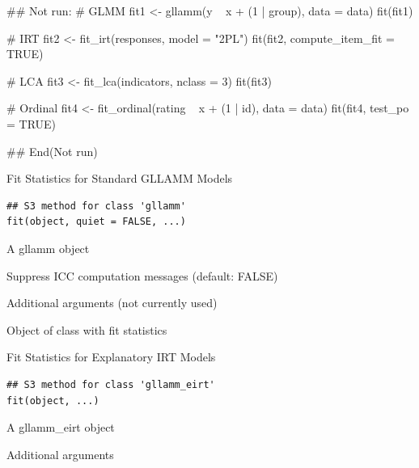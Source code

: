 \documentclass[a4paper]{book}
\begin{document}
%
\begin{Examples}
\begin{ExampleCode}
## Not run: 
# GLMM
fit1 <- gllamm(y ~ x + (1 | group), data = data)
fit(fit1)

# IRT
fit2 <- fit_irt(responses, model = "2PL")
fit(fit2, compute_item_fit = TRUE)

# LCA
fit3 <- fit_lca(indicators, nclass = 3)
fit(fit3)

# Ordinal
fit4 <- fit_ordinal(rating ~ x + (1 | id), data = data)
fit(fit4, test_po = TRUE)

## End(Not run)

\end{ExampleCode}
\end{Examples}
%
\begin{Description}
Fit Statistics for Standard GLLAMM Models
\end{Description}
%
\begin{Usage}
\begin{verbatim}
## S3 method for class 'gllamm'
fit(object, quiet = FALSE, ...)
\end{verbatim}
\end{Usage}
%
\begin{Arguments}
\begin{ldescription}
\item[\code{object}] A gllamm object

\item[\code{quiet}] Suppress ICC computation messages (default: FALSE)

\item[\code{...}] Additional arguments (not currently used)
\end{ldescription}
\end{Arguments}
%
\begin{Value}
Object of class  with fit statistics
\end{Value}
%
\begin{Description}
Fit Statistics for Explanatory IRT Models
\end{Description}
%
\begin{Usage}
\begin{verbatim}
## S3 method for class 'gllamm_eirt'
fit(object, ...)
\end{verbatim}
\end{Usage}
%
\begin{Arguments}
\begin{ldescription}
\item[\code{object}] A gllamm\_eirt object

\item[\code{...}] Additional arguments
\end{ldescription}
\end{Arguments}
\end{document}
